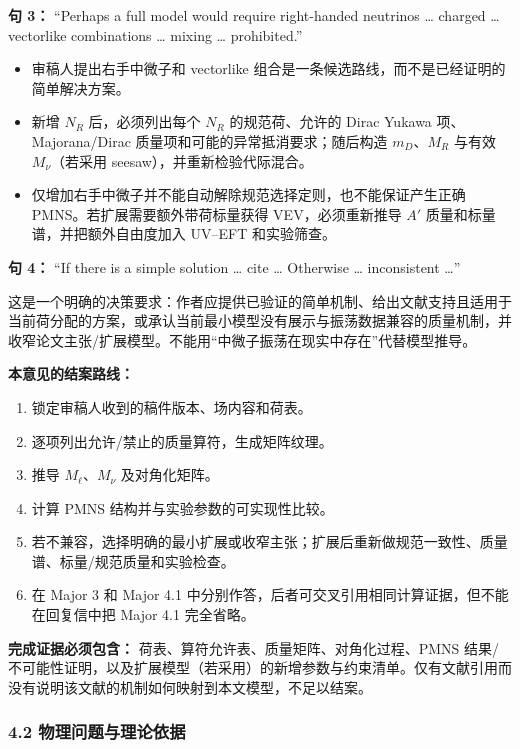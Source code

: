\documentclass[
  chinese,
  UTF8]{ctexart}
\providecommand{\tightlist}{%
  \setlength{\itemsep}{0pt}\setlength{\parskip}{0pt}}
\begin{document}
\textbf{句 3：} ``Perhaps a full model would require right-handed
neutrinos \ldots{} charged \ldots{} vectorlike combinations \ldots{}
mixing \ldots{} prohibited.''

\begin{itemize}
\tightlist
\item
  审稿人提出右手中微子和 vectorlike
  组合是一条候选路线，而不是已经证明的简单解决方案。
\item
  新增 \(N_R\) 后，必须列出每个 \(N_R\) 的规范荷、允许的 Dirac Yukawa
  项、Majorana/Dirac 质量项和可能的异常抵消要求；随后构造
  \(m_D\)、\(M_R\) 与有效 \(M_\nu\)（若采用
  seesaw），并重新检验代际混合。
\item
  仅增加右手中微子并不能自动解除规范选择定则，也不能保证产生正确
  PMNS。若扩展需要额外带荷标量获得 VEV，必须重新推导 \(A'\)
  质量和标量谱，并把额外自由度加入 UV--EFT 和实验筛查。
\end{itemize}

\textbf{句 4：} ``If there is a simple solution \ldots{} cite \ldots{}
Otherwise \ldots{} inconsistent \ldots''

这是一个明确的决策要求：作者应提供已验证的简单机制、给出文献支持且适用于当前荷分配的方案，或承认当前最小模型没有展示与振荡数据兼容的质量机制，并收窄论文主张/扩展模型。不能用``中微子振荡在现实中存在''代替模型推导。

\textbf{本意见的结案路线：}

\begin{enumerate}
\def\labelenumi{\arabic{enumi}.}
\tightlist
\item
  锁定审稿人收到的稿件版本、场内容和荷表。
\item
  逐项列出允许/禁止的质量算符，生成矩阵纹理。
\item
  推导 \(M_\ell\)、\(M_\nu\) 及对角化矩阵。
\item
  计算 PMNS 结构并与实验参数的可实现性比较。
\item
  若不兼容，选择明确的最小扩展或收窄主张；扩展后重新做规范一致性、质量谱、标量/规范质量和实验检查。
\item
  在 Major 3 和 Major 4.1
  中分别作答，后者可交叉引用相同计算证据，但不能在回复信中把 Major 4.1
  完全省略。
\end{enumerate}

\textbf{完成证据必须包含：} 荷表、算符允许表、质量矩阵、对角化过程、PMNS
结果/不可能性证明，以及扩展模型（若采用）的新增参数与约束清单。仅有文献引用而没有说明该文献的机制如何映射到本文模型，不足以结案。

\subsubsection{4.2 物理问题与理论依据}\label{major-3-step-2}
\end{document}
